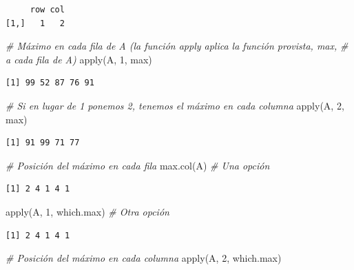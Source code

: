 \documentclass[
]{book}
\newenvironment{Shaded}{\begin{snugshade}}{\end{snugshade}}
\newcommand{\CommentTok}[1]{\textcolor[rgb]{0.56,0.35,0.01}{\textit{#1}}}
\newcommand{\DecValTok}[1]{\textcolor[rgb]{0.00,0.00,0.81}{#1}}
\newcommand{\FunctionTok}[1]{\textcolor[rgb]{0.00,0.00,0.00}{#1}}
\newcommand{\NormalTok}[1]{#1}
\begin{document}
\begin{itemize}
\begin{verbatim}
     row col
[1,]   1   2
\end{verbatim}

\begin{Shaded}
\begin{Highlighting}[]
\CommentTok{\# Máximo en cada fila de A (la función apply aplica la función provista, max, }
\CommentTok{\# a cada fila de A)}
\FunctionTok{apply}\NormalTok{(A, }\DecValTok{1}\NormalTok{, max)}
\end{Highlighting}
\end{Shaded}

\begin{verbatim}
[1] 99 52 87 76 91
\end{verbatim}

\begin{Shaded}
\begin{Highlighting}[]
\CommentTok{\# Si en lugar de 1 ponemos 2, tenemos el máximo en cada columna}
\FunctionTok{apply}\NormalTok{(A, }\DecValTok{2}\NormalTok{, max)}
\end{Highlighting}
\end{Shaded}

\begin{verbatim}
[1] 91 99 71 77
\end{verbatim}

\begin{Shaded}
\begin{Highlighting}[]
\CommentTok{\# Posición del máximo en cada fila}
\FunctionTok{max.col}\NormalTok{(A) }\CommentTok{\# Una opción}
\end{Highlighting}
\end{Shaded}

\begin{verbatim}
[1] 2 4 1 4 1
\end{verbatim}

\begin{Shaded}
\begin{Highlighting}[]
\FunctionTok{apply}\NormalTok{(A, }\DecValTok{1}\NormalTok{, which.max) }\CommentTok{\# Otra opción}
\end{Highlighting}
\end{Shaded}

\begin{verbatim}
[1] 2 4 1 4 1
\end{verbatim}

\begin{Shaded}
\begin{Highlighting}[]
\CommentTok{\# Posición del máximo en cada columna}
\FunctionTok{apply}\NormalTok{(A, }\DecValTok{2}\NormalTok{, which.max)}
\end{Highlighting}
\end{Shaded}


\end{itemize}
\end{document}
